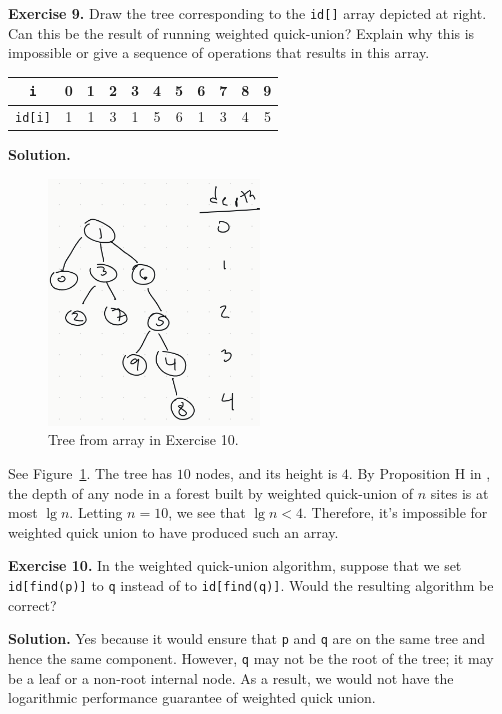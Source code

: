 \documentclass[12pt, a4paper]{article}
\newenvironment{ex}[2][Exercise]
{\par\medskip\noindent \textbf{#1 #2.}}
{\medskip}
\newenvironment{sol}[1][Solution]
{\par\medskip\noindent \textbf{#1.} }
{\medskip}
\begin{document}
	\begin{ex}{9}
		Draw the tree corresponding to the \texttt{id[]} array depicted at right. Can this
		be the result of running weighted quick-union? Explain why this is impossible or give a
		sequence of operations that results in this array.
		\begin{center}
			\begin{tabular}{c|cccccccccc}
				\texttt{i} & 0 & 1 & 2 & 3 & 4 & 5 & 6 & 7 & 8 & 9\\
				\hline
				\texttt{id[i]} & 1 & 1 & 3 & 1 & 5 &6 & 1 & 3 & 4 & 5
			\end{tabular}
		\end{center}
	\end{ex}
	\begin{sol}
		\begin{figure}
			\centering
			\includegraphics[width=0.5\textwidth]{exercise-10-union-find-tree}
			\caption{Tree from array in Exercise 10.}
			\label{ex-10}
		\end{figure}
		See Figure~\ref{ex-10}. The tree has $10$ nodes, and its height is $4$. By Proposition H
		in \cite{sedgewick_wayne}, the depth of any node in a forest built by weighted quick-union
		of $n$ sites is at most $\lg n$. Letting $n=10$, we see that $\lg n<4$. Therefore,
		it's impossible for weighted quick union to have produced such an array.
	\end{sol}
	\begin{ex}{10}
		In the weighted quick-union algorithm, suppose that we set \texttt{id[find(p)]} to
		\texttt{q} instead of to \texttt{id[find(q)]}. Would the resulting algorithm be
		correct?
	\end{ex}
	\begin{sol}
		Yes because it would ensure that \texttt{p} and \texttt{q} are on the same tree
		and hence the same component. However, \texttt{q} may not be the root of the tree;
		it may be a leaf or a non-root internal node. As a result, we would not have the
		logarithmic performance guarantee of weighted quick union.
	\end{sol}
\end{document}
